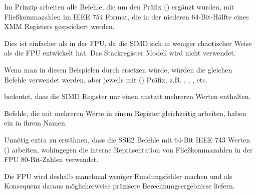 Im Prinzip arbeiten alle Befehle, die um den Präfix  () ergänzt wurden, mit
Fließkommazahlen im IEEE 754 Format, die in der niederen 64-Bit-Hälfte eines XMM Registers gespeichert werden.

Dies ist einfacher als in der FPU, da die SIMD sich in weniger chaotischer Weise als die FPU entwickelt hat.
Das Stackregister Modell wird nicht verwendet.

Wenn man in diesen Beispielen \Tdouble durch \Tfloat ersetzen würde, würden die gleichen Befehle verwendet werden, aber
jeweils mit () Präfix, z.B. , , , etc.

 bedeutet, dass die SIMD Register nur einen anstatt mehreren Werten enthalten.

Befehle, die mit mehreren Werte in einem Register gleichzeitig arbeiten, haben ein  in ihrem Namen.

Unnötig extra zu erwähnen, dass die SSE2 Befehle mit 64-Bit IEEE 743 Werten (\Tdouble) arbeiten, wohingegen die interne
Repräsentation von Fließkommazahlen in der FPU 80-Bit-Zahlen verwendet.

Die FPU wird deshalb manchmal weniger Rundungsfehler machen und als Konsequenz daraus möglicherweise präzisere
Berechnungsergebnisse liefern.
